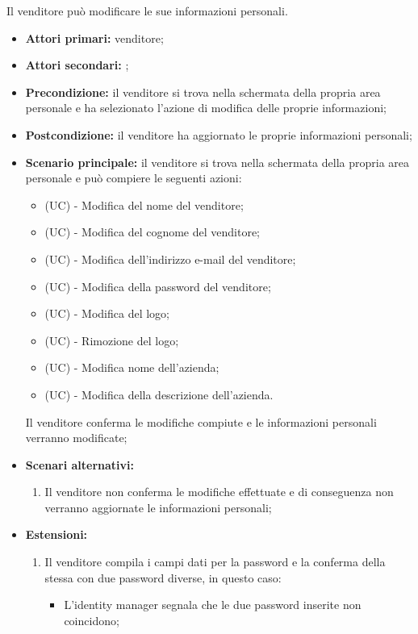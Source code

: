 Il venditore può modificare le sue informazioni personali.
\begin{itemize}
    \item \textbf{Attori primari:} venditore;
    \item \textbf{Attori secondari:} ;
    \item \textbf{Precondizione:} il venditore si trova nella schermata della propria area personale e ha selezionato l'azione di modifica delle proprie informazioni;
    \item \textbf{Postcondizione:} il venditore ha aggiornato le proprie informazioni personali;
    \item \textbf{Scenario principale:} il venditore si trova nella schermata della propria area personale e può compiere le seguenti azioni:
    \begin{itemize}
    	\item (UC) - Modifica del nome del venditore;
    	\item (UC) - Modifica del cognome del venditore;
        \item (UC) - Modifica dell'indirizzo e-mail del venditore;
        \item (UC) - Modifica della password del venditore;
        \item (UC) - Modifica del logo;
        \item (UC) - Rimozione del logo;
        \item (UC) - Modifica nome dell'azienda;
        \item (UC) - Modifica della descrizione dell'azienda.
    \end{itemize}
    Il venditore conferma le modifiche compiute e le informazioni personali verranno modificate;
    \item \textbf{Scenari alternativi:}
    \begin{enumerate}[label=\lett]
    	\item Il venditore non conferma le modifiche effettuate e di conseguenza non verranno aggiornate le informazioni personali;
    \end{enumerate}
    \item \textbf{Estensioni:}
    \begin{enumerate}[label=\lett]
    	\item Il venditore compila i campi dati per la password e la conferma della stessa con due password diverse, in questo caso:
    	\begin{itemize}
    		\item L'identity manager segnala che le due password inserite non coincidono;

\end{itemize}
\end{enumerate}
\end{itemize}
